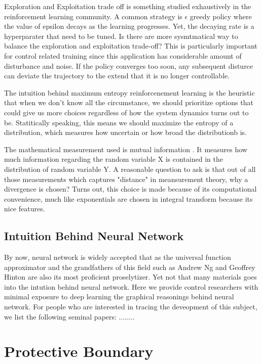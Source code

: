 \documentclass[journal]{IEEEtran}
\begin{document}
Exploration and Exploitation trade off is something studied exhaustively in the reinforcement learning community. A common strategy is $\epsilon$ greedy policy where the value of epsilon decays as the learning progresses. Yet, the decaying rate is a hyperparater that need to be tuned. Is there are more sysmtmatical way to balance the exploration and exploitation trade-off? This is particularly important for control related training since this application has considerable amount of disturbance and noise. If the policy converges too soon, any subsequent disturce can deviate the trajectory to the extend that it is no longer controllable.

The intuition behind maximum entropy reinforcenement learning is the heuristic that when we don't know all the circumstance, we should prioritize options that could give us more choices regardless of how the system dynamics turns out to be. Statitically speaking, this means we should maximize the entropy of a distribution, which measures how uncertain or how broad the distributionb is.

The mathematical measurement used is mutual information \cite{Kullback1951ONIA}. It measures how much information regarding the random variable X is contained in the distribution of random variable Y. A reasonable question to ask is that out of all those measurements which captures "distance" in meansurement theory, why a divergence is chosen? Turns out, this choice is made because of its computational convenience, much like exponentials are chosen in integral transform because its nice features.

\subsection{Intuition Behind Neural Network}
By now, neural network is widely accepted that as the universal function approximator \cite{Hornik1991ApproximationCO} and the grandfathers of this field such as Andrew Ng and Geoffrey Hinton are also its most proficient proselytizer. Yet not that many materials goes into the intution behind neural network. Here we provide control researchers with minimal exposure to deep learning the graphical reasonings behind neural network. For people who are interested in tracing the deveopment of this subject, we list the following seminal papers: \cite{Schwartz1989TheNC} \cite{Hornik1989MultilayerFN}........


\section{Protective Boundary}
\end{document}
